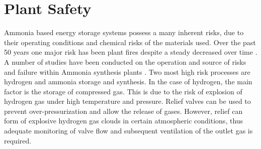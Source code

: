 





\newcommand\tc{400}
\newcommand\pbar{150}
\newcommand\ammOUT{227.6}  %
\newcommand\conv{34}	%
\newcommand\purge{5}


%

{\renewcommand{\arraystretch}{1.0}}
\section{Plant Safety}

Ammonia based energy storage systems possess a many inherent risks, due to their operating conditions and chemical risks of the materials used. Over the past 50 years one major risk has been plant fires despite a steady decreased over time \cite{Ojha2010}\cite{Williams1999}. A number of studies have been conducted on the operation and source of risks and failure within Ammonia synthesis plants \cite{Ojha2010}. Two most high risk processes are hydrogen and ammonia storage and synthesis. In the case of hydrogen, the main factor is the storage of compressed gas. This is due to the risk of explosion of hydrogen gas under high temperature and pressure. Relief valves can be used to prevent over-pressurization and allow the release of gases. However, relief can form of explosive hydrogen gas clouds in certain atmospheric conditions, thus adequate monitoring of valve flow and subsequent ventilation of the outlet gas is required. 



